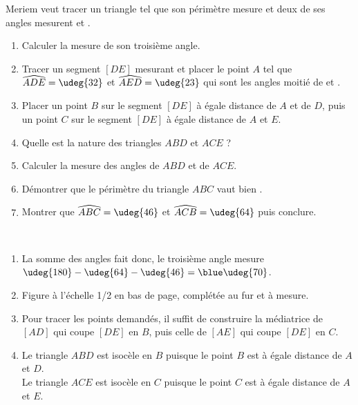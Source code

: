\begin{colonne*exercice}
\begin{exercice} %
   Meriem veut tracer un triangle tel que son périmètre mesure  et deux de ses angles mesurent  et .
   \begin{enumerate}
      \item Calculer la mesure de son troisième angle.
      \item Tracer un segment $[DE]$ mesurant  et placer le point $A$ tel que $\widehat{ADE} =\udeg{32}$ et $\widehat{AED} =\udeg{23}$ qui sont les angles moitié de  et .
      \item Placer un point $B$ sur le segment $[DE]$ à égale distance de $A$ et de $D$, puis un point $C$ sur le segment $[DE]$ à égale distance de $A$ et $E$. 
      \item Quelle est la nature des triangles $ABD$ et $ACE$ ?
      \item Calculer la mesure des angles de $ABD$ et de $ACE$.
      \item Démontrer que le périmètre du triangle $ABC$ vaut bien .
      \item Montrer que $\widehat{ABC} =\udeg{46}$ et $\widehat{ACB} =\udeg{64}$ puis conclure.
   \end{enumerate}
\end{exercice}

\begin{corrige}
   \ \\ [-5mm]
    \begin{enumerate}
      \item La somme des angles fait  donc, le troisième angle mesure $\udeg{180}-\udeg{64}-\udeg{46} =\blue\udeg{70}$.
      \item Figure à l'échelle 1/2 en bas de page, complétée au fur et à mesure.
      \item Pour tracer les points demandés, il suffit de construire la médiatrice de $[AD]$ qui coupe $[DE]$ en $B$, puis celle de $[AE]$ qui coupe $[DE]$ en $C$.
      \item {\blue Le triangle $ABD$ est isocèle en $B$} puisque le point $B$ est à égale distance de $A$ et $D$. \\
         {\blue Le triangle $ACE$ est isocèle en $C$} puisque le point $C$ est à égale distance de $A$ et $E$.
   \end{enumerate}
   
\Coupe


\end{corrige}
\end{colonne*exercice}
